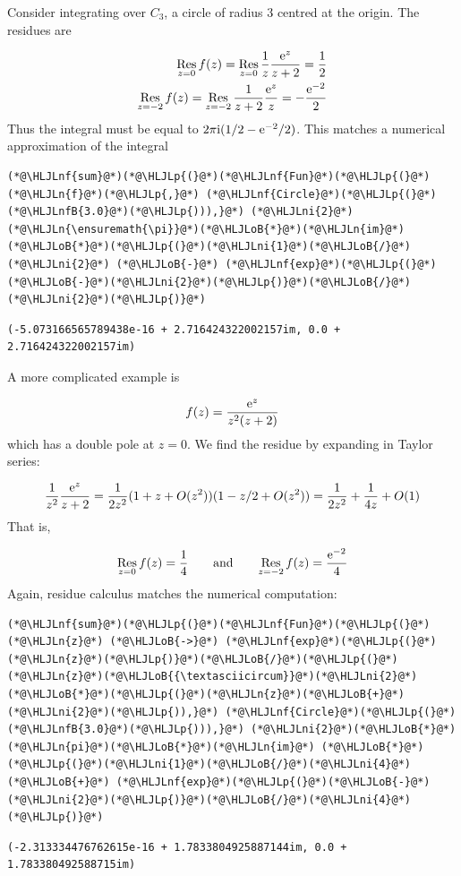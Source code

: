 \documentclass[12pt,a4paper]{article}
\newcommand{\HLJLn}[1]{#1}
\newcommand{\HLJLnf}[1]{\textcolor[RGB]{66,102,213}{#1}}
\newcommand{\HLJLnfB}[1]{\textcolor[RGB]{59,151,46}{#1}}
\newcommand{\HLJLni}[1]{\textcolor[RGB]{59,151,46}{#1}}
\newcommand{\HLJLoB}[1]{\textcolor[RGB]{102,102,102}{\textbf{#1}}}
\newcommand{\HLJLp}[1]{#1}
\def\qqand{\qquad\hbox{and}\qquad}
\def\I{ {\rm i} }
\def\E{ {\rm e} }
\def\Res_#1{\underset{#1}{\rm Res}\,}
\begin{document}
Consider integrating over $C_3$, a circle of radius 3 centred at the origin.  The residues are


\begin{align*}
\Res_{z=0} f(z) = \Res_{z=0}  {1 \over z} {\E^z \over z+2} = {1 \over 2} \\
\Res_{z=-2} f(z) = \Res_{z=-2}  {1 \over z+2} {\E^z \over z} = -{\E^{-2} \over 2}
\end{align*}
Thus the integral must be equal to $2 \pi \I (1/2 - \E^{-2} /2)$.  This matches a numerical approximation of the integral 


\begin{lstlisting}
(*@\HLJLnf{sum}@*)(*@\HLJLp{(}@*)(*@\HLJLnf{Fun}@*)(*@\HLJLp{(}@*)(*@\HLJLn{f}@*)(*@\HLJLp{,}@*) (*@\HLJLnf{Circle}@*)(*@\HLJLp{(}@*)(*@\HLJLnfB{3.0}@*)(*@\HLJLp{))),}@*) (*@\HLJLni{2}@*)(*@\HLJLn{\ensuremath{\pi}}@*)(*@\HLJLoB{*}@*)(*@\HLJLn{im}@*)(*@\HLJLoB{*}@*)(*@\HLJLp{(}@*)(*@\HLJLni{1}@*)(*@\HLJLoB{/}@*)(*@\HLJLni{2}@*) (*@\HLJLoB{-}@*) (*@\HLJLnf{exp}@*)(*@\HLJLp{(}@*)(*@\HLJLoB{-}@*)(*@\HLJLni{2}@*)(*@\HLJLp{)}@*)(*@\HLJLoB{/}@*)(*@\HLJLni{2}@*)(*@\HLJLp{)}@*)
\end{lstlisting}

\begin{lstlisting}
(-5.073166565789438e-16 + 2.716424322002157im, 0.0 + 2.716424322002157im)
\end{lstlisting}


A more complicated example is 

\[
f(z) = {\E^z \over z^2 (z+2)}
\]
which has a double pole at $z = 0$. We find the residue by expanding in Taylor series:

\[
 {1 \over z^2} {\E^z \over z +2} = {1 \over  2 z^2} (1 + z + O(z^2)) (1 - z/2 + O(z^2)) =
        {1 \over 2 z^2} + {1 \over 4 z} + O(1)
\]
That is,

\[
\Res_{z=0} f(z) = {1 \over 4} \qqand \Res_{z=-2} f(z) = {\E^{-2} \over 4}
\]
Again, residue calculus matches the numerical computation:


\begin{lstlisting}
(*@\HLJLnf{sum}@*)(*@\HLJLp{(}@*)(*@\HLJLnf{Fun}@*)(*@\HLJLp{(}@*)(*@\HLJLn{z}@*) (*@\HLJLoB{->}@*) (*@\HLJLnf{exp}@*)(*@\HLJLp{(}@*)(*@\HLJLn{z}@*)(*@\HLJLp{)}@*)(*@\HLJLoB{/}@*)(*@\HLJLp{(}@*)(*@\HLJLn{z}@*)(*@\HLJLoB{{\textasciicircum}}@*)(*@\HLJLni{2}@*)(*@\HLJLoB{*}@*)(*@\HLJLp{(}@*)(*@\HLJLn{z}@*)(*@\HLJLoB{+}@*)(*@\HLJLni{2}@*)(*@\HLJLp{)),}@*) (*@\HLJLnf{Circle}@*)(*@\HLJLp{(}@*)(*@\HLJLnfB{3.0}@*)(*@\HLJLp{))),}@*) (*@\HLJLni{2}@*)(*@\HLJLoB{*}@*)(*@\HLJLn{pi}@*)(*@\HLJLoB{*}@*)(*@\HLJLn{im}@*) (*@\HLJLoB{*}@*) (*@\HLJLp{(}@*)(*@\HLJLni{1}@*)(*@\HLJLoB{/}@*)(*@\HLJLni{4}@*) (*@\HLJLoB{+}@*) (*@\HLJLnf{exp}@*)(*@\HLJLp{(}@*)(*@\HLJLoB{-}@*)(*@\HLJLni{2}@*)(*@\HLJLp{)}@*)(*@\HLJLoB{/}@*)(*@\HLJLni{4}@*)(*@\HLJLp{)}@*)
\end{lstlisting}

\begin{lstlisting}
(-2.313334476762615e-16 + 1.7833804925887144im, 0.0 + 1.783380492588715im)
\end{lstlisting}
\end{document}
